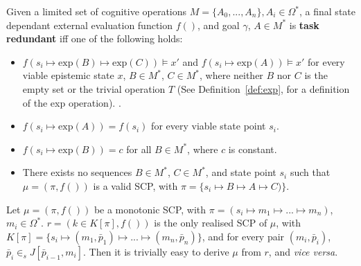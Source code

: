 \begin{definition} \label{lem:taskredundant}
Given a limited set of cognitive operations $M=\{A_0, ..., A_n\}, A_i \in \Omega^*$, a final state dependant external evaluation function  $f()$, and goal $\gamma$, $A \in M^*$ is \textbf{task redundant} iff one of the following holds:
\begin{itemize}
\item $f(s_i \longmapsto \text{exp}(B) \longmapsto \text{exp}(C)) \models x'$ and $f(s_i \longmapsto \text{exp}(A)) \models x'$ for every viable epistemic state $x$, $B \in M^*$, $C \in M^*$, where neither $B$ nor $C$ is the empty set or the trivial operation $T$ (See Definition~\ref{def:exp}, for a definition of the exp operation). . 
\item $f(s_i \longmapsto \text{exp}(A)) = f(s_i)$ for every viable state point $s_i$.
\item $f(s_i \longmapsto \text{exp}(B))=c$ for all $B \in M^*$, where $c$ is constant.
\item There exists no sequences $B \in M^*$, $C \in M^*$, and state point $s_i$ such that $\mu=(\pi,f())$ is a valid SCP, with $\pi=\{s_i \longmapsto B \longmapsto A \longmapsto C)\}$.
\end{itemize}
\end{definition}














\begin{lemma}\label{lemma:monorealisedandback}
Let $\mu=(\pi,f())$ be a monotonic SCP, with $\pi=(s_i \longmapsto m_1 \longmapsto ... \longmapsto m_n)$, $m_i\in \Omega^*$. $r=(k \in K[\pi],f())$ is the only realised SCP of $\mu$, with $K[\pi]=\{s_i \longmapsto (m_1,\bar{p}_1) \longmapsto ... \longmapsto (m_n,\bar{p}_n)\}$, and for every pair $(m_i,\bar{p}_i)$, $\bar{p}_i \in_s J[\bar{p}_{i-1},m_i]$. Then it is trivially easy to derive $\mu$ from $r$, and \textit{vice versa}.
\end{lemma}

